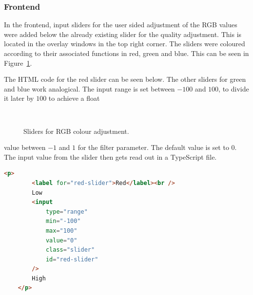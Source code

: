 \documentclass[../MasterThesis.tex]{subfiles}
\begin{document}
\subsubsection*{Frontend}
%
\vspace*{-1em}
\begin{minipage}{0.48\textwidth}
In the frontend, input sliders for the user sided adjustment of the RGB values were added below the already existing slider for the quality adjustment. This is located in the overlay windows in the top right corner. The sliders were coloured according to their associated functions in red, green and blue. This can be seen in Figure~\ref{figure:sliders}.

The HTML code for the red slider can be seen below. The other sliders for green and blue work analogical. The input range is set between $-100$ and $100$, to divide it later by $100$ to achieve a float 




\end{minipage}\begin{minipage}{0.04\textwidth}
\ 
\end{minipage}\begin{minipage}{0.48\textwidth}
\begin{figure}[H]
	\begin{center}
		\caption[Sliders for RGB colour adjustment.]{Sliders for RGB colour adjustment.}
		\label{figure:sliders}
	\end{center}
\end{figure}
\hfill
\end{minipage}

\vspace*{-1.3em}
value between $-1$ and $1$ for the filter parameter. The default value is set to $0$. The input value from the slider then gets read out in a TypeScript file.  


\begin{lstlisting}[language=html, numbers=none]
	<p>
		<label for="red-slider">Red</label><br />
		Low
		<input
			type="range"
			min="-100"
			max="100"
			value="0"
			class="slider"
			id="red-slider"
		/>
		High
	</p>
\end{lstlisting}






\end{document}

